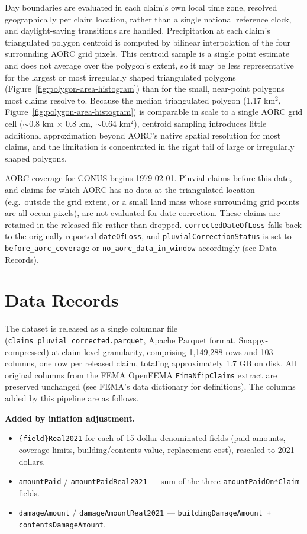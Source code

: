 Day boundaries are evaluated in each claim's own local time zone,
resolved geographically per claim location, rather than a single
national reference clock, and daylight-saving transitions are handled.
% 
Precipitation at each claim's triangulated polygon centroid is computed by bilinear interpolation of the four surrounding AORC grid pixels.
%
This centroid sample is a single point estimate and does not average
over the polygon's extent, so it may be less representative for the
largest or most irregularly shaped triangulated polygons (Figure~\ref{fig:polygon-area-histogram}) than for the
small, near-point polygons most claims resolve to. Because the median
triangulated polygon (1.17 km$^2$, Figure~\ref{fig:polygon-area-histogram}) is comparable in scale to a single AORC grid
cell ($\sim$0.8 km $\times$ 0.8 km, $\sim$0.64 km$^2$), centroid sampling
introduces little additional approximation beyond AORC's native spatial
resolution for most claims, and the limitation is concentrated in the
right tail of large or irregularly shaped polygons.

AORC coverage for CONUS begins 1979-02-01. Pluvial claims before this
date, and claims for which AORC has no data at the triangulated
location (e.g.\ outside the grid extent, or a small land mass whose
surrounding grid points are all ocean pixels), are not evaluated for
date correction. These claims are retained in the released file rather
than dropped. \texttt{correctedDateOfLoss} falls back to the originally
reported \texttt{dateOfLoss}, and \texttt{pluvialCorrectionStatus} is
set to \texttt{before\_aorc\_coverage} or
\texttt{no\_aorc\_data\_in\_window} accordingly (see Data Records).

\section*{Data Records}

The dataset is released as a single columnar file
(\texttt{claims\_pluvial\_corrected.parquet}, Apache Parquet format,
Snappy-compressed) at claim-level granularity, comprising 1{,}149{,}288
rows and 103 columns, one row per released claim, totaling
approximately 1.7 GB on disk. All original columns from the FEMA OpenFEMA
\texttt{FimaNfipClaims} extract are preserved unchanged (see FEMA's
data dictionary for definitions). The columns added by this pipeline
are as follows.

\textbf{Added by inflation adjustment.}
\begin{itemize}
  \item \texttt{\{field\}Real2021} for each of 15 dollar-denominated
    fields (paid amounts, coverage limits, building/contents value,
    replacement cost), rescaled to 2021 dollars.
  \item \texttt{amountPaid} / \texttt{amountPaidReal2021} --- sum of the
    three \texttt{amountPaidOn*Claim} fields.
  \item \texttt{damageAmount} / \texttt{damageAmountReal2021} ---
    \texttt{buildingDamageAmount + contentsDamageAmount}.
\end{itemize}


